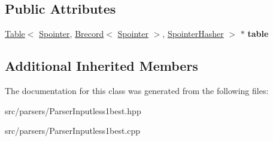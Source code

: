 \subsection*{Public Attributes}
\begin{DoxyCompactItemize}
\item 
\mbox{\label{classParserInputless1best_a83854d4a7990be0efcca8c616dc78979}} 
\mbox{\hyperlink{classTable}{Table}}$<$ \mbox{\hyperlink{classSpointer}{Spointer}}, \mbox{\hyperlink{classBrecord}{Brecord}}$<$ \mbox{\hyperlink{classSpointer}{Spointer}} $>$, \mbox{\hyperlink{structSpointerHasher}{Spointer\+Hasher}} $>$ $\ast$ {\bfseries table}
\end{DoxyCompactItemize}
\subsection*{Additional Inherited Members}


The documentation for this class was generated from the following files\+:\begin{DoxyCompactItemize}
\item 
src/parsers/Parser\+Inputless1best.\+hpp\item 
src/parsers/Parser\+Inputless1best.\+cpp\end{DoxyCompactItemize}

